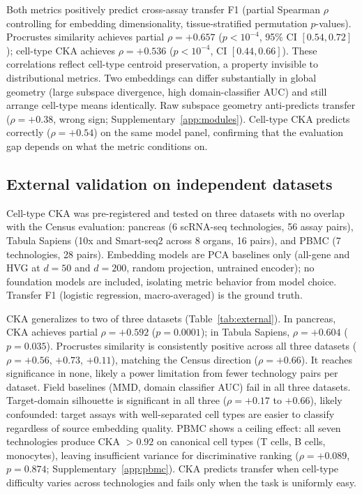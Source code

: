 \documentclass[11pt]{article}
\begin{document}
Both metrics positively predict cross-assay transfer F1 (partial Spearman $\rho$ controlling for embedding dimensionality, tissue-stratified permutation $p$-values). Procrustes similarity achieves partial $\rho = +0.657$ ($p < 10^{-4}$, 95\% CI $[0.54, 0.72]$); cell-type CKA achieves $\rho = +0.536$ ($p < 10^{-4}$, CI $[0.44, 0.66]$). These correlations reflect cell-type centroid preservation, a property invisible to distributional metrics. Two embeddings can differ substantially in global geometry (large subspace divergence, high domain-classifier AUC) and still arrange cell-type means identically. Raw subspace geometry anti-predicts transfer ($\rho = +0.38$, wrong sign; Supplementary~\ref{app:modules}). Cell-type CKA predicts correctly ($\rho = +0.54$) on the same model panel, confirming that the evaluation gap depends on what the metric conditions on.


\subsection{External validation on independent datasets}
\label{sec:external}

Cell-type CKA was pre-registered and tested on three datasets with no overlap with the Census evaluation: pancreas \citep{luecken2022scib} (6 scRNA-seq technologies, 56 assay pairs), Tabula Sapiens \citep{tabulasapiens2022} (10x and Smart-seq2 across 8 organs, 16 pairs), and PBMC \citep{ding2020systematic} (7 technologies, 28 pairs). Embedding models are PCA baselines only (all-gene and HVG at $d = 50$ and $d = 200$, random projection, untrained encoder); no foundation models are included, isolating metric behavior from model choice. Transfer F1 (logistic regression, macro-averaged) is the ground truth.

CKA generalizes to two of three datasets (Table~\ref{tab:external}). In pancreas, CKA achieves partial $\rho = +0.592$ ($p = 0.0001$); in Tabula Sapiens, $\rho = +0.604$ ($p = 0.035$). Procrustes similarity is consistently positive across all three datasets ($\rho = +0.56$, $+0.73$, $+0.11$), matching the Census direction ($\rho = +0.66$). It reaches significance in none, likely a power limitation from fewer technology pairs per dataset. Field baselines (MMD, domain classifier AUC) fail in all three datasets. Target-domain silhouette is significant in all three ($\rho = +0.17$ to $+0.66$), likely confounded: target assays with well-separated cell types are easier to classify regardless of source embedding quality. PBMC shows a ceiling effect: all seven technologies produce CKA $> 0.92$ on canonical cell types (T cells, B cells, monocytes), leaving insufficient variance for discriminative ranking ($\rho = +0.089$, $p = 0.874$; Supplementary~\ref{app:pbmc}). CKA predicts transfer when cell-type difficulty varies across technologies and fails only when the task is uniformly easy.
\end{document}
